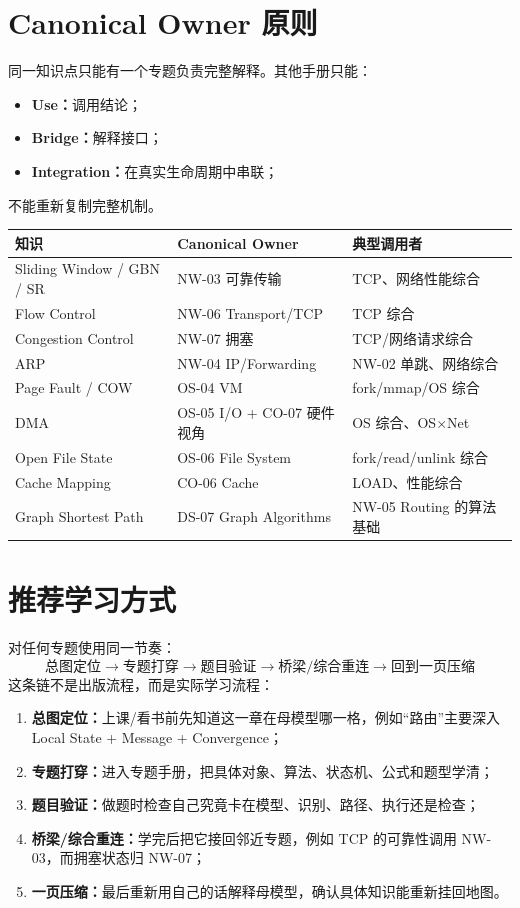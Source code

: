 \documentclass[11pt,a4paper,openany]{ctexbook}
\newcommand{\key}[1]{\textbf{\color{deep}#1}}
\begin{document}
\section{Canonical Owner 原则}
同一知识点只能有一个专题负责完整解释。其他手册只能：
\begin{itemize}
  \item \key{Use：}调用结论；
  \item \key{Bridge：}解释接口；
  \item \key{Integration：}在真实生命周期中串联；
\end{itemize}
不能重新复制完整机制。

\begin{longtable}{L{3.7cm}L{4.3cm}L{\dimexpr\linewidth-9.27cm\relax}}
\toprule
\textbf{知识} & \textbf{Canonical Owner} & \textbf{典型调用者}\\
\midrule
Sliding Window / GBN / SR & NW-03 可靠传输 & TCP、网络性能综合\\
Flow Control & NW-06 Transport/TCP & TCP 综合\\
Congestion Control & NW-07 拥塞 & TCP/网络请求综合\\
ARP & NW-04 IP/Forwarding & NW-02 单跳、网络综合\\
Page Fault / COW & OS-04 VM & fork/mmap/OS 综合\\
DMA & OS-05 I/O + CO-07 硬件视角 & OS 综合、OS×Net\\
Open File State & OS-06 File System & fork/read/unlink 综合\\
Cache Mapping & CO-06 Cache & LOAD、性能综合\\
Graph Shortest Path & DS-07 Graph Algorithms & NW-05 Routing 的算法基础\\
\bottomrule
\end{longtable}

\section{推荐学习方式}
对任何专题使用同一节奏：
\[
\boxed{\text{总图定位}\rightarrow\text{专题打穿}\rightarrow\text{题目验证}\rightarrow\text{桥梁/综合重连}\rightarrow\text{回到一页压缩}}
\]
这条链不是出版流程，而是实际学习流程：
\begin{enumerate}
  \item \key{总图定位：}上课/看书前先知道这一章在母模型哪一格，例如“路由”主要深入 Local State + Message + Convergence；
  \item \key{专题打穿：}进入专题手册，把具体对象、算法、状态机、公式和题型学清；
  \item \key{题目验证：}做题时检查自己究竟卡在模型、识别、路径、执行还是检查；
  \item \key{桥梁/综合重连：}学完后把它接回邻近专题，例如 TCP 的可靠性调用 NW-03，而拥塞状态归 NW-07；
  \item \key{一页压缩：}最后重新用自己的话解释母模型，确认具体知识能重新挂回地图。
\end{enumerate}
\end{document}
